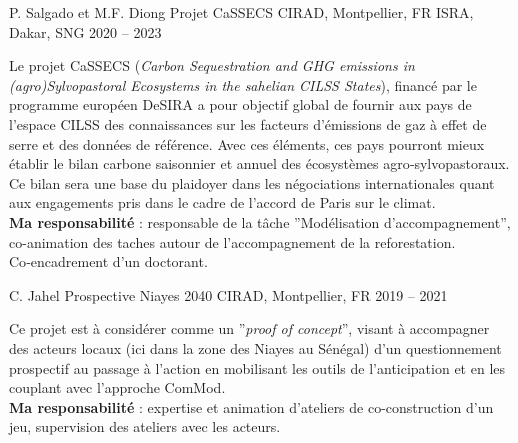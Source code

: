 

\begin{cventries}

  \cventry
    {P. Salgado et M.F. Diong} %
    {Projet CaSSECS} %
    {CIRAD, Montpellier, FR \hspace{5em} ISRA, Dakar, SNG} %
    {2020 -- 2023} %
    {
      \begin{cvitems} %
        Le projet CaSSECS (\emph{Carbon Sequestration and GHG emissions in (agro)Sylvopastoral Ecosystems in the sahelian CILSS States}), financé par le programme européen DeSIRA a pour objectif global de fournir aux pays de l’espace CILSS des connaissances sur les facteurs d’émissions de gaz à effet de serre et des données de référence. Avec ces éléments, ces pays pourront mieux établir le bilan carbone saisonnier et annuel des écosystèmes agro‑sylvopastoraux. Ce bilan sera une base du plaidoyer dans les négociations internationales quant aux engagements pris dans le cadre de l’accord de Paris sur le climat.\\
        \textbf{Ma responsabilité } : responsable de la tâche ”Modélisation d’accompagnement”, co-animation des taches autour de l'accompagnement de la reforestation. Co‑encadrement d’un doctorant.
      \end{cvitems}
    }

  \cventry
  {C. Jahel} %
  {Prospective Niayes 2040} %
  {CIRAD, Montpellier, FR} %
  {2019 -- 2021} %
  {
    \begin{cvitems} %
      Ce projet est à considérer comme un ”\textit{proof of concept}”, visant à accompagner des acteurs locaux (ici dans la zone des Niayes au Sénégal) d’un questionnement prospectif au passage à l’action en mobilisant les outils de l’anticipation et en les couplant avec l’approche ComMod.\\
      \textbf{Ma responsabilité} : expertise et animation d'ateliers de co-construction d'un jeu, supervision des ateliers avec les acteurs.
    \end{cvitems}
  }


\end{cventries}
